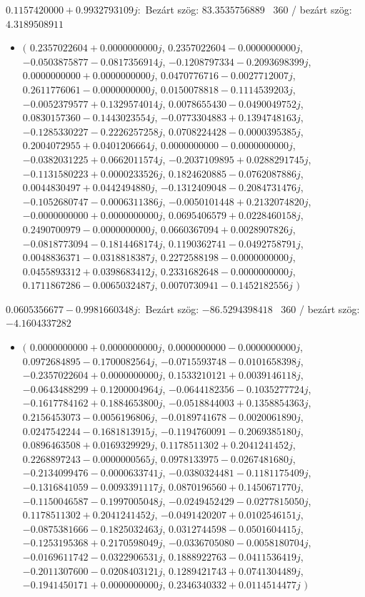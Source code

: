 \documentclass[14pt,a4paper]{article}
\begin{document}
$0.1157420000+0.9932793109j$:\
Bezárt szög: $83.3535756889$ \
360 / bezárt szög: $4.3189508911$\
\begin{itemize}
\item
$\big($
$0.2357022604+0.0000000000j$, $0.2357022604-0.0000000000j$, $-0.0503875877-0.0817356914j$, $-0.1208797334-0.2093698399j$, $0.0000000000+0.0000000000j$, $0.0470776716-0.0027712007j$, $0.2611776061-0.0000000000j$, $0.0150078818-0.1114539203j$, $-0.0052379577+0.1329574014j$, $0.0078655430-0.0490049752j$, $0.0830157360-0.1443023554j$, $-0.0773304883+0.1394748163j$, $-0.1285330227-0.2226257258j$, $0.0708224428-0.0000395385j$, $0.2004072955+0.0401206664j$, $0.0000000000-0.0000000000j$, $-0.0382031225+0.0662011574j$, $-0.2037109895+0.0288291745j$, $-0.1131580223+0.0000233526j$, $0.1824620885-0.0762087886j$, $0.0044830497+0.0442494880j$, $-0.1312409048-0.2084731476j$, $-0.1052680747-0.0006311386j$, $-0.0050101448+0.2132074820j$, $-0.0000000000+0.0000000000j$, $0.0695406579+0.0228460158j$, $0.2490700979-0.0000000000j$, $0.0660367094+0.0028907826j$, $-0.0818773094-0.1814468174j$, $0.1190362741-0.0492758791j$, $0.0048836371-0.0318818387j$, $0.2272588198-0.0000000000j$, $0.0455893312+0.0398683412j$, $0.2331682648-0.0000000000j$, $0.1711867286-0.0065032487j$, $0.0070730941-0.1452182556j$
$\big)$
\end{itemize}
$0.0605356677-0.9981660348j$:\
Bezárt szög: $-86.5294398418$ \
360 / bezárt szög: $-4.1604337282$\
\begin{itemize}
\item
$\big($
$0.0000000000+0.0000000000j$, $0.0000000000-0.0000000000j$, $0.0972684895-0.1700082564j$, $-0.0715593748-0.0101658398j$, $-0.2357022604+0.0000000000j$, $0.1533210121+0.0039146118j$, $-0.0643488299+0.1200004964j$, $-0.0644182356-0.1035277724j$, $-0.1617784162+0.1884653800j$, $-0.0518844003+0.1358854363j$, $0.2156453073-0.0056196806j$, $-0.0189741678-0.0020061890j$, $0.0247542244-0.1681813915j$, $-0.1194760091-0.2069385180j$, $0.0896463508+0.0169329929j$, $0.1178511302+0.2041241452j$, $0.2268897243-0.0000000565j$, $0.0978133975-0.0267481680j$, $-0.2134099476-0.0000633741j$, $-0.0380324481-0.1181175409j$, $-0.1316841059-0.0093391117j$, $0.0870196560+0.1450671770j$, $-0.1150046587-0.1997005048j$, $-0.0249452429-0.0277815050j$, $0.1178511302+0.2041241452j$, $-0.0491420207+0.0102546151j$, $-0.0875381666-0.1825032463j$, $0.0312744598-0.0501604415j$, $-0.1253195368+0.2170598049j$, $-0.0336705080-0.0058180704j$, $-0.0169611742-0.0322906531j$, $0.1888922763-0.0411536419j$, $-0.2011307600-0.0208403121j$, $0.1289421743+0.0741304489j$, $-0.1941450171+0.0000000000j$, $0.2346340332+0.0114514477j$
$\big)$
\end{itemize}
\end{document}
